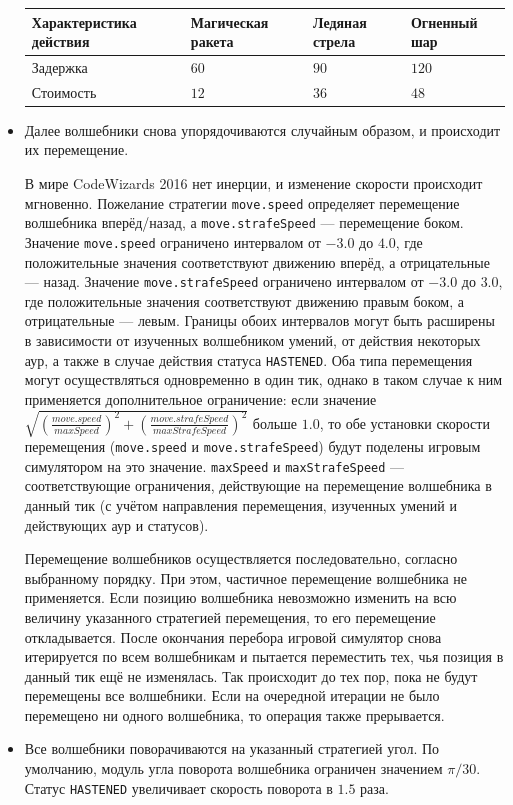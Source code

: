 \begin{itemize}
          \begin{tabular}{| l | l | l | l |}
              \hline
              Характеристика действия & Магическая ракета     & Ледяная стрела & Огненный шар \\
              \hline
              Задержка                & $60$\footnotemark[12] & $90$           & $120$        \\
              Стоимость               & $12$                  & $36$           & $48$         \\
              \hline
          \end{tabular}
    \item Далее волшебники снова упорядочиваются случайным образом, и происходит их перемещение.

          В мире CodeWizards 2016 нет инерции, и изменение скорости происходит мгновенно. Пожелание стратегии \texttt{move.speed} определяет
          перемещение волшебника вперёд/назад, а \texttt{move.strafeSpeed} --- перемещение боком. Значение \texttt{move.speed} ограничено
          интервалом от $-3.0$ до $4.0$, где положительные значения соответствуют движению вперёд, а отрицательные --- назад. Значение
          \texttt{move.strafeSpeed} ограничено интервалом от $-3.0$ до $3.0$, где положительные значения соответствуют движению правым
          боком, а отрицательные --- левым. Границы обоих интервалов могут быть расширены в зависимости от изученных волшебником умений, от
          действия некоторых аур, а также в случае действия статуса \texttt{HASTENED}. Оба типа перемещения могут осуществляться
          одновременно в один тик, однако в таком случае к ним применяется дополнительное ограничение: если значение
          \texttt{$\sqrt{(\frac{move.speed}{maxSpeed})^2 + (\frac{move.strafeSpeed}{maxStrafeSpeed})^2}$} больше $1.0$, то обе установки
          скорости перемещения (\texttt{move.speed} и \texttt{move.strafeSpeed}) будут поделены игровым симулятором на это значение.
          \texttt{maxSpeed} и \texttt{maxStrafeSpeed} --- соответствующие ограничения, действующие на перемещение волшебника в данный тик (с
          учётом направления перемещения, изученных умений и действующих аур и статусов).

          Перемещение волшебников осуществляется последовательно, согласно выбранному порядку. При этом, частичное перемещение волшебника не
          применяется. Если позицию волшебника невозможно изменить на всю величину указанного стратегией перемещения\footnotemark[13], то
          его перемещение откладывается. После окончания перебора игровой симулятор снова итерируется по всем волшебникам и пытается
          переместить тех, чья позиция в данный тик ещё не изменялась. Так происходит до тех пор, пока не будут перемещены все волшебники.
          Если на очередной итерации не было перемещено ни одного волшебника, то операция также прерывается.

    \item Все волшебники поворачиваются на указанный стратегией угол. По умолчанию, модуль угла поворота волшебника ограничен значением
          $\pi / 30$. Статус \texttt{HASTENED} увеличивает скорость поворота в $1.5$ раза.
\end{itemize}


